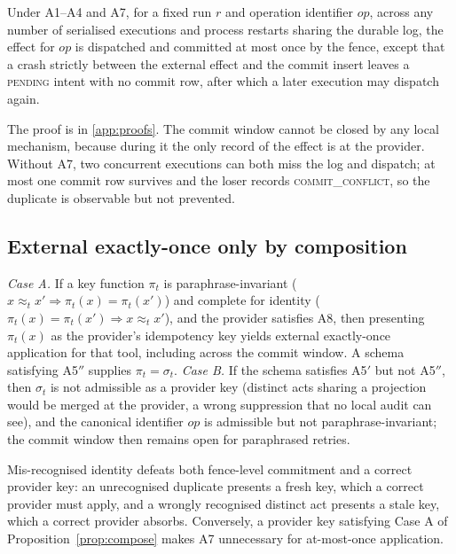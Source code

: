 \begin{proposition}\label{prop:amo}
Under A1--A4 and A7, for a fixed run $r$ and operation identifier $\mathit{op}$, across any number of serialised executions and process restarts sharing the durable log, the effect for $\mathit{op}$ is dispatched and committed at most once by the fence, except that a crash strictly between the external effect and the commit insert leaves a \textsc{pending} intent with no commit row, after which a later execution may dispatch again.
\end{proposition}

The proof is in \ref{app:proofs}. The commit window cannot be closed by any local mechanism, because during it the only record of the effect is at the provider. Without A7, two concurrent executions can both miss the log and dispatch; at most one commit row survives and the loser records \textsc{commit\_conflict}, so the duplicate is observable but not prevented.

\subsection{External exactly-once only by composition}\label{sec:compose}

\begin{proposition}\label{prop:compose}
\emph{Case A.} If a key function $\pi_t$ is paraphrase-invariant ($x\approx_t x'\Rightarrow\pi_t(x)=\pi_t(x')$) and complete for identity ($\pi_t(x)=\pi_t(x')\Rightarrow x\approx_t x'$), and the provider satisfies A8, then presenting $\pi_t(x)$ as the provider's idempotency key yields external exactly-once application for that tool, including across the commit window. A schema satisfying A5$''$ supplies $\pi_t=\sigma_t$.
\emph{Case B.} If the schema satisfies A5$'$ but not A5$''$, then $\sigma_t$ is not admissible as a provider key (distinct acts sharing a projection would be merged at the provider, a wrong suppression that no local audit can see), and the canonical identifier $\mathit{op}$ is admissible but not paraphrase-invariant; the commit window then remains open for paraphrased retries.
\end{proposition}

\begin{proposition}\label{prop:structure}
Mis-recognised identity defeats both fence-level commitment and a correct provider key: an unrecognised duplicate presents a fresh key, which a correct provider must apply, and a wrongly recognised distinct act presents a stale key, which a correct provider absorbs. Conversely, a provider key satisfying Case A of Proposition~\ref{prop:compose} makes A7 unnecessary for at-most-once application.
\end{proposition}

